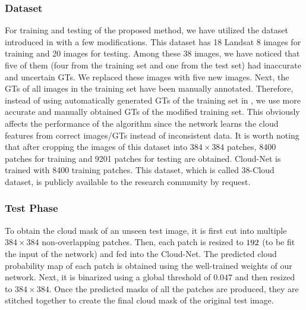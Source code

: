 \documentclass{article}
\begin{document}
\subsubsection{Dataset}
For training and testing of the proposed method, we have utilized the dataset introduced in \cite{mymmsp} with a few modifications. This dataset has 18 Landsat 8 images for training and 20 images for testing. Among these 38 images, we have noticed that five of them (four from the training set and one from the test set) had inaccurate and uncertain GTs. We replaced these images with five new images. Next, the GTs of all images in the training set have been manually annotated. Therefore, instead of using automatically generated GTs of the training set in \cite{mymmsp}, we use more accurate and manually obtained GTs of the modified training set. This obviously affects the performance of the algorithm since the network learns the cloud features from correct images/GTs instead of inconsistent data. It is worth noting that after cropping the images of this dataset into $384\times384$ patches, 8400 patches for training and 9201 patches for testing are obtained. Cloud-Net is trained with 8400 training patches. This dataset, which is called 38-Cloud dataset, is publicly available to the research community by request. 



\subsubsection{Test Phase}
To obtain the cloud mask of an unseen test image, it is first cut into multiple $384\times384$ non-overlapping patches. Then, each patch is resized to $192\time192$ (to be fit the input of the network) and fed into the Cloud-Net. The predicted cloud probability map of each patch is obtained using the well-trained weights of our network. Next, it is binarized using a global threshold of $0.047$ and then resized to $384\times384$. Once the predicted masks of all the patches are produced, they are stitched together to create the final cloud mask of the original test image.
\end{document}
